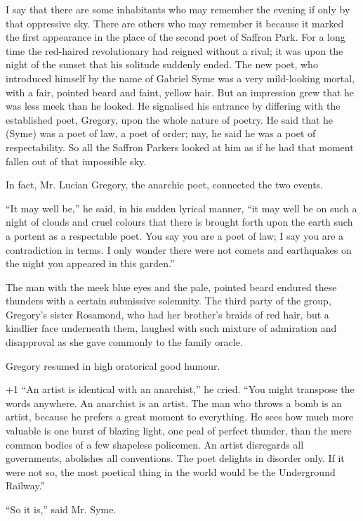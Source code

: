 I say that there are some inhabitants who may remember the evening if only by that oppressive sky. There are others who may remember it because it marked the first appearance in the place of the second poet of Saffron Park. For a long time the red-haired revolutionary had reigned without a rival; it was upon the night of the sunset that his solitude suddenly ended. The new poet, who introduced himself by the name of Gabriel Syme was a very mild-looking mortal, with a fair, pointed beard and faint, yellow hair. But an impression grew that he was less meek than he looked. He signalised his entrance by differing with the established poet, Gregory, upon the whole nature of poetry. He said that he (Syme) was a poet of law, a poet of order; nay, he said he was a poet of respectability. So all the Saffron Parkers looked at him as if he had that moment fallen out of that impossible sky.

In fact, Mr. Lucian Gregory, the anarchic poet, connected the two events.

“It may well be,” he said, in his sudden lyrical manner, “it may well be on such a night of clouds and cruel colours that there is brought forth upon the earth such a portent as a respectable poet. You say you are a poet of law; I say you are a contradiction in terms. I only wonder there were not comets and earthquakes on the night you appeared in this garden.”

The man with the meek blue eyes and the pale, pointed beard endured these thunders with a certain submissive solemnity. The third party of the group, Gregory’s sister Rosamond, who had her brother’s braids of red hair, but a kindlier face underneath them, laughed with such mixture of admiration and disapproval as she gave commonly to the family oracle.

Gregory resumed in high oratorical good humour.

\looseness+1
“An artist is identical with an anarchist,” he cried. “You might transpose the words anywhere. An anarchist is an artist. The man who throws a bomb is an artist, because he prefers a great moment to everything. He sees how much more valuable is one burst of blazing light, one peal of perfect thunder, than the mere common bodies of a few shapeless policemen. An artist disregards all governments, abolishes all conventions. The poet delights in disorder only. If it were not so, the most poetical thing in the world would be the Underground Railway.”

“So it is,” said Mr. Syme.

